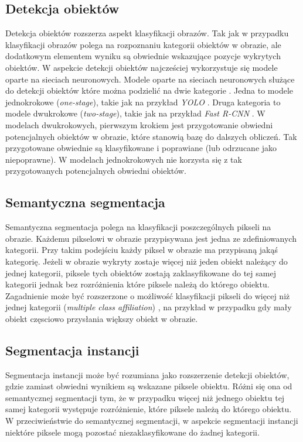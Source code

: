 \subsection*{Detekcja obiektów}
Detekcja obiektów rozszerza aspekt klasyfikacji obrazów. Tak jak w przypadku klasyfikacji obrazów polega na rozpoznaniu kategorii obiektów w obrazie, ale dodatkowym elementem wyniku są obwiednie wskazujące pozycje wykrytych obiektów. W aspekcie detekcji obiektów najcześciej wykorzystuje się modele oparte na sieciach neuronowych. Modele oparte na sieciach neuronowych służące do detekcji obiektów które można podzielić na dwie kategorie \cite{survey-deep-learning-object-dection}. Jedna to modele jednokrokowe (\textit{one-stage}), takie jak na przykład \textit{YOLO} \cite{yolo}. Druga kategoria to modele dwukrokowe (\textit{two-stage}), takie jak na przykład \textit{Fast R-CNN} \cite{fast-rcnn}. W modelach dwukrokowych, pierwszym krokiem jest przygotowanie obwiedni potencjalnych obiektów w obrazie, które stanowią bazę do dalszych obliczeń. Tak przygotowane obwiednie są klasyfikowane i poprawiane (lub odrzucane jako niepoprawne). W modelach jednokrokowych nie korzysta się z tak przygotowanych potencjalnych obwiedni obiektów.

\subsection*{Semantyczna segmentacja}
Semantyczna segmentacja polega na klasyfikacji poszczególnych pikseli na obrazie. Każdemu pikselowi w obrazie przypisywana jest jedna ze zdefiniowanych kategorii. Przy takim podejściu każdy piksel w obrazie ma przypisaną jakąś kategorię. Jeżeli w obrazie wykryty zostaje więcej niż jeden obiekt należący do jednej kategorii, piksele tych obiektów zostają zaklasyfikowane do tej samej kategorii jednak bez rozróżnienia które piksele należą do którego obiektu.
Zagadnienie może być rozszerzone o możliwość klasyfikacji pikseli do więcej niż jednej kategorii (\textit{multiple class affiliation}) \cite{survey-semantic-segmentation}, na przykład w przypadku gdy mały obiekt częsciowo przysłania większy obiekt w obrazie.

\subsection*{Segmentacja instancji}
Segmentacja instancji może być rozumiana jako rozszerzenie detekcji obiektów, gdzie zamiast obwiedni wynikiem są wskazane piksele obiektu. Różni się ona od semantycznej segmentacji tym, że w przypadku więcej niż jednego obiektu tej samej kategorii występuje rozróżnienie, które piksele należą do którego obiektu. W przeciwieństwie do semantycznej segmentacji, w aspekcie segmentacji instancji niektóre piksele mogą pozostać niezaklasyfikowane do żadnej kategorii.

